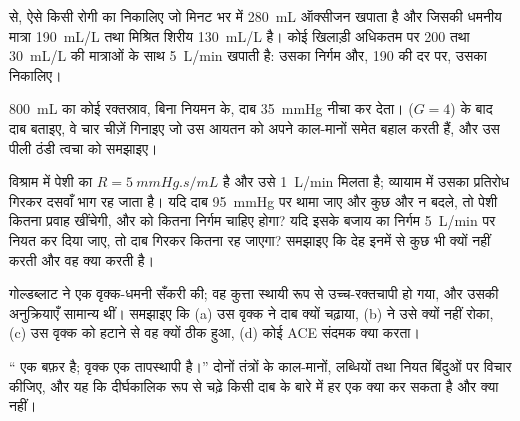 \begin{exercise}[$\star\star$]\label{exo:b2:blood-pressure:8}
 से, ऐसे किसी रोगी का  निकालिए जो
मिनट भर में \qty{280}{mL} ऑक्सीजन खपाता है और जिसकी धमनीय मात्रा
\qty{190}{mL/L} तथा मिश्रित शिरीय \qty{130}{mL/L} है। कोई खिलाड़ी
अधिकतम पर 200 तथा \qty{30}{mL/L} की मात्राओं के साथ \qty{5}{L/min}
खपाती है: उसका निर्गम और, 190 की दर पर, उसका
 निकालिए।
\end{exercise}

\begin{exercise}[$\star\star$]\label{exo:b2:blood-pressure:9}
\qty{800}{mL} का कोई रक्तस्राव, बिना नियमन के, दाब
\qty{35}{mmHg} नीचा कर देता।  ($G = 4$) के बाद दाब बताइए,
वे चार चीज़ें गिनाइए जो उस आयतन को अपने काल-मानों समेत बहाल करती
हैं, और उस पीली ठंडी त्वचा को समझाइए।
\end{exercise}

\begin{exercise}[$\star\star\star$]\label{exo:b2:blood-pressure:10}
विश्राम में पेशी का $R = \qty{5}{mmHg.s/mL}$ है और उसे
\qty{1}{L/min} मिलता है; व्यायाम में उसका प्रतिरोध गिरकर दसवाँ भाग रह जाता है। यदि
दाब \qty{95}{mmHg} पर थामा जाए और कुछ और न बदले,
तो पेशी कितना प्रवाह खींचेगी, और  को कितना निर्गम चाहिए होगा?
यदि इसके बजाय  का निर्गम \qty{5}{L/min} पर नियत कर दिया जाए, तो
दाब गिरकर कितना रह जाएगा? समझाइए कि देह इनमें से कुछ भी क्यों नहीं करती और
वह क्या करती है।
\end{exercise}

\begin{exercise}[$\star\star\star$]\label{exo:b2:blood-pressure:11}
गोल्डब्लाट ने एक वृक्क-धमनी सँकरी की; वह कुत्ता स्थायी रूप से
उच्च-रक्तचापी हो गया, और उसकी  अनुक्रियाएँ सामान्य थीं। समझाइए कि (a) उस
वृक्क ने दाब क्यों चढ़ाया, (b)  ने उसे क्यों नहीं रोका,
(c) उस वृक्क को हटाने से वह क्यों ठीक हुआ, (d) कोई ACE संदमक
क्या करता।
\end{exercise}

\begin{exercise}[$\star\star\star$]\label{exo:b2:blood-pressure:12}
`` एक बफ़र है; वृक्क एक तापस्थापी है।''
दोनों तंत्रों के काल-मानों, लब्धियों तथा नियत बिंदुओं पर विचार कीजिए,
और यह कि दीर्घकालिक रूप से चढ़े किसी दाब के बारे में हर एक क्या कर सकता है और क्या नहीं।
\end{exercise}

